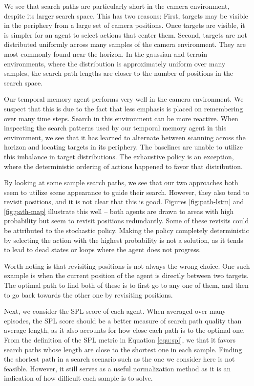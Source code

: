 We see that search paths are particularly short in the camera environment,
despite its larger search space.
This has two reasons:
First, targets may be visible in the periphery from a large set of camera positions.
Once targets are visible, it is simpler for an agent to select actions that center them.
Second, targets are not distributed uniformly across many samples of the camera environment.
They are most commonly found near the horizon.
In the gaussian and terrain environments, where the distribution is approximately uniform over many samples, the search path lengths are closer to the number of positions in the search space.

Our temporal memory agent performs very well in the camera environment.
We suspect that this is due to the fact that less emphasis is placed on remembering over many time steps.
Search in this environment can be more reactive.
When inspecting the search patterns used by our temporal memory agent in this environment, we see that it has learned to alternate between scanning across the horizon and locating targets in its periphery.
The baselines are unable to utilize this imbalance in target distributions.
The exhaustive policy is an exception, where the deterministic ordering of actions happened to favor that distribution. 

By looking at some sample search paths, we see that our two approaches both seem to utilize scene appearance to guide their search.
However, they also tend to revisit positions, and it is not clear that this is good.
Figures \ref{fig:path-lstm} and \ref{fig:path-map} illustrate this well --
both agents are drawn to areas with high probability but seem to revisit positions redundantly.
Some of these revisits could be attributed to the stochastic policy.
Making the policy completely deterministic by selecting the action with the highest probability is not a solution, as it tends to lead to dead states or loops where the agent does not progress.

Worth noting is that revisiting positions is not always the wrong choice.
One such example is when the current position of the agent is directly between two targets.
The optimal path to find both of these is to first go to any one of them, and then to go back towards the other one by revisiting positions.

Next, we consider the SPL score of each agent.
When averaged over many episodes, the SPL score should be a better measure of search path quality than average length, as it also accounts for how close each path is to the optimal one.
From the definition of the SPL metric in Equation \ref{equ:spl}, we that it favors search paths whose length are close to the shortest one in each sample.
Finding the shortest path in a search scenario such as the one we consider here is not feasible.
However, it still serves as a useful normalization method as it is an indication of how difficult each sample is to solve.

